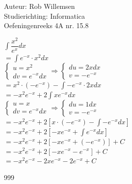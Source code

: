\documentclass[a4paper]{article}
\newcommand{\dint}{\displaystyle\int}
\begin{document}
\noindent \large Auteur: Rob Willemsen \\
\noindent \large Studierichting: Informatica \\
\noindent \large Oefeningenreeks 4A nr. 15.8 \\

\medskip

\normalsize

$\dint \dfrac{x^2}{e^x} dx$ \\

$= \dint e^{-x} \cdot x^2 dx$ \\

$ \left\{
\begin{array}{l}
u = x^2  \\
dv = e^{-x} dx
\end{array} \right.
\Rightarrow
\left\{
\begin{array}{l}
du = 2x dx \\
v = -e^{-x}
\end{array} 
\right.$ \\

$= x^2 \cdot (-e^{-x}) - \dint -e^{-x} \cdot 2x dx$ \\

$= -x^2 e^{-x} + 2 \dint x e^{-x} dx$ \\

$ \left\{
\begin{array}{l}
u = x \\
dv = e^{-x} dx
\end{array} \right.
\Rightarrow
\left\{
\begin{array}{l}
du = 1dx \\
v = -e^{-x}
\end{array} 
\right.$ \\

$= -x^2e^{-x} + 2 \left[ x \cdot(-e^{-x}) - \dint -e^{-x} dx \right]$ \\

$= -x^2e^{-x} + 2 \left[-x e^{-x} + \dint e^{-x} dx \right]$ \\

$= -x^2e^{-x} + 2 \left[-x e^{-x} + (-e^{-x}) \right] + C$ \\

$= -x^2e^{-x} + 2 \left[-x e^{-x} - e^{-x} \right] + C$ \\

$= -x^2e^{-x} - 2xe^{-x} - 2e^{-x} + C$ \\

\begin{thebibliography}{999}
\end{thebibliography}
\end{document}
